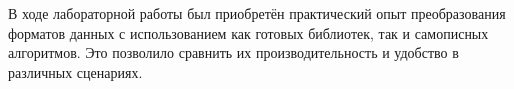 В ходе лабораторной работы был приобретён практический опыт преобразования форматов данных с использованием как готовых библиотек, так и самописных алгоритмов. Это позволило сравнить их производительность и удобство  в различных сценариях.